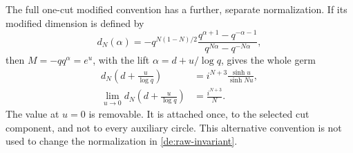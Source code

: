 The full one-cut modified convention has a further, separate
normalization. If its modified dimension is defined by
\[
 d_N(\alpha)=-q^{N(1-N)/2}
 \frac{q^{\alpha+1}-q^{-\alpha-1}}
      {q^{N\alpha}-q^{-N\alpha}},
\]
then \(M=-q q^\alpha=e^u\), with the lift
\(\alpha=d+u/\log q\), gives the whole germ
\begin{equation}\label{de:modified-dimension}
 \begin{aligned}
 d_N\!\left(d+\frac{u}{\log q}\right)
   &=i^{N+3}\frac{\sinh u}{\sinh Nu},\\
 \lim_{u\to0}d_N\!\left(d+\frac{u}{\log q}\right)
   &=\frac{i^{N+3}}N.
 \end{aligned}
\end{equation}
The value at \(u=0\) is removable. It is attached once, to the
selected cut component, and not to every auxiliary circle.
This alternative convention is not used to change the
normalization in \eqref{de:raw-invariant}.
